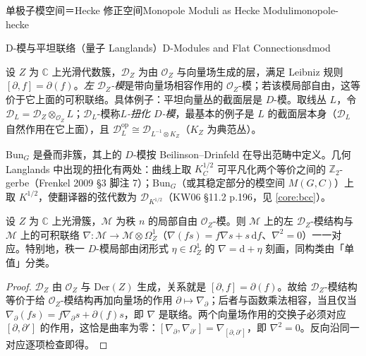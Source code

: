 \begin{centry}{单极子模空间＝Hecke 修正空间}{Monopole Moduli as Hecke Moduli}{monopole-hecke}
\end{centry}

\begin{centry}{D-模与平坦联络（量子 Langlands）}{D-Modules and Flat Connections}{dmod}

\begin{definition}[$D$-模与扭化 $D$-模]
设 $Z$ 为 $\mathbb{C}$ 上光滑代数簇，$\mathcal{D}_Z$ 为由 $\mathcal{O}_Z$ 与向量场生成的层，满足 Leibniz 规则 $[\partial,f]=\partial(f)$。\emph{左 $\mathcal{D}_Z$-模}是带向量场相容作用的 $\mathcal{O}_Z$-模；若该模局部自由，这等价于它上面的可积联络。具体例子：平坦向量丛的截面层是 $D$-模。取线丛 $L$，令 $\mathcal{D}_{L}=\mathcal{D}_Z\otimes_{\mathcal{O}_Z}L$；$\mathcal{D}_{L}$-模称\emph{$L$-扭化 $D$-模}，最基本的例子是 $L$ 的截面层本身（$\mathcal{D}_{L}$ 自然作用在它上面），且 $\mathcal{D}_{L}^{\mathrm{op}}\cong\mathcal{D}_{L^{-1}\otimes K_Z}$（$K_Z$ 为典范丛）。

$\mathrm{Bun}_G$ 是叠而非簇，其上的 $D$-模按 Beilinson--Drinfeld 在导出范畴中定义。几何 Langlands 中出现的扭化有两处：曲线上取 $K_C^{1/2}$ 可平凡化两个等价之间的 $\mathbb{Z}_2$-gerbe（Frenkel 2009 §3 脚注 7）；$\mathrm{Bun}_G$（或其稳定部分的模空间 $M(G,C)$）上取 $K^{1/2}$，使翻译器的弦代数为 $\mathcal{D}_{K^{1/2}}$（KW06 §11.2 p.196，见 \ref{core:bcc}）。
\end{definition}

\begin{theorem}[$D$-模 $=$ 可积联络]
设 $Z$ 为 $\mathbb{C}$ 上光滑簇，$\mathcal{M}$ 为秩 $n$ 的局部自由 $\mathcal{O}_Z$-模。则 $\mathcal{M}$ 上的左 $\mathcal{D}_Z$-模结构与 $\mathcal{M}$ 上的可积联络 $\nabla:\mathcal{M}\to\mathcal{M}\otimes\Omega^{1}_Z$（$\nabla(fs)=f\nabla s+s\,\mathrm{d}f$、$\nabla^{2}=0$）一一对应。特别地，秩一 $D$-模局部由闭形式 $\eta\in\Omega^{1}_Z$ 的 $\nabla=\mathrm{d}+\eta$ 刻画，同构类由「单值」分类。
\end{theorem}
\begin{proof}
$\mathcal{D}_Z$ 由 $\mathcal{O}_Z$ 与 $\mathrm{Der}(Z)$ 生成，关系就是 $[\partial,f]=\partial(f)$。故给 $\mathcal{D}_Z$-模结构等价于给 $\mathcal{O}_Z$-模结构再加向量场的作用 $\partial\mapsto\nabla_{\partial}$；后者与函数乘法相容，当且仅当 $\nabla_{\partial}(fs)=f\nabla_{\partial}s+\partial(f)s$，即 $\nabla$ 是联络。两个向量场作用的交换子必须对应 $[\partial,\partial']$ 的作用，这恰是曲率为零：$[\nabla_{\partial},\nabla_{\partial'}]=\nabla_{[\partial,\partial']}$，即 $\nabla^{2}=0$。反向沿同一对应逐项检查即得。
\end{proof}


\end{centry}
